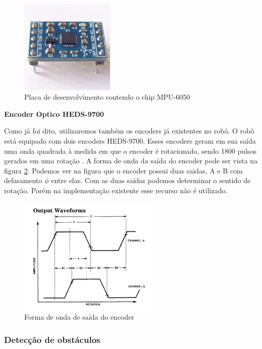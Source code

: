 \begin{figure}[H]
\centering
\includegraphics[width=0.4\textwidth]{./figuras/mpu6050.JPG}
\caption[Placa de desenvolvimento contendo o chip MPU-6050]{Placa de desenvolvimento contendo o chip MPU-6050}
\label{fig:mpu6050}
\end{figure}

\textbf{Encoder Optico HEDS-9700}

Como já foi dito, utilizaremos também os encoders já existentes no robô. O robô está equipado com dois encoders HEDS-9700.
Esses encoders geram em sua saída uma onda quadrada à medida em que o encoder é rotacionado, sendo 1800 pulsos gerados em uma rotação \cite{heds9700}. A forma de onda da saída do encoder pode ser vista na figura \ref{fig:heds9700}. Podemos ver na figura que o encoder possui duas saidas, A e B com defasamento $\phi$ entre elas. Com as duas saídas podemos determinar o sentido de rotação. Porém na implementação existente esse recurso não é utilizado.

\begin{figure}[H]
\centering
\includegraphics[width=0.6\textwidth]{./figuras/heds9700.png}
\caption[Forma de onda de saída do encoder]{Forma de onda de saída do encoder}
\label{fig:heds9700}
\end{figure}

\subsubsection{Detecção de obstáculos}

